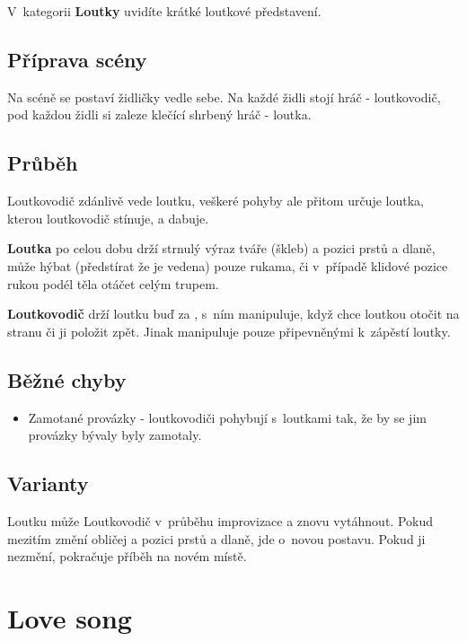 V~kategorii \textbf{Loutky}  uvidíte krátké loutkové představení. 
 
\subsection{Příprava scény} Na scéně se postaví židličky vedle sebe. Na každé židli stojí hráč - loutkovodič, pod každou židli si zaleze klečící shrbený hráč - loutka. 
 
\subsection{Průběh} Loutkovodič zdánlivě vede loutku, veškeré pohyby ale přitom určuje loutka, kterou loutkovodič stínuje, a dabuje. 
 
\textbf{Loutka} po celou dobu drží strnulý výraz tváře (škleb) a pozici prstů a dlaně, může hýbat (předstírat že je vedena) pouze rukama, či v~případě klidové pozice rukou podél těla otáčet celým trupem. 
 
\textbf{Loutkovodič} drží loutku buď  za  , s~ním manipuluje, když chce loutkou otočit na stranu či ji položit zpět. 
Jinak manipuluje pouze   připevněnými k~zápěstí loutky.   
  
\subsection{ Běžné chyby } \begin{itemize}
\item  Zamotané provázky - loutkovodiči pohybují s~loutkami tak, že by se jim provázky bývaly byly zamotaly.
\end{itemize}
 
\subsection{Varianty} Loutku může Loutkovodič v~průběhu improvizace   a znovu vytáhnout. Pokud mezitím změní obličej a pozici prstů a dlaně, jde o~novou postavu. Pokud ji nezmění, pokračuje příběh na novém místě.  
 
 
 
 
\needspace{5cm} \section{Love song} \label{love song}  
 
